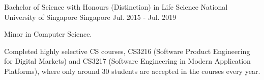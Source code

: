 

\begin{cventries}

  \cventry
    {Bachelor of Science with Honours (Distinction) in Life Science } %
    {National University of Singapore} %
    {Singapore} %
    {Jul. 2015 - Jul. 2019} %
    {
      \begin{cvitems} %
        \item {Minor in Computer Science.}
        \item {Completed highly selective CS courses, CS3216 (Software Product Engineering for Digital Markets) and CS3217 (Software Engineering in Modern Application Platforms), where only around 30 students are accepted in the courses every year.}
      \end{cvitems}
    }

\end{cventries}
